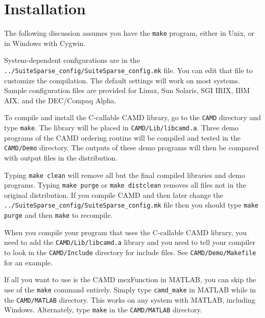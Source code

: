 \documentclass[11pt]{article}
\begin{document}
\section{Installation}
\label{Install}

The following discussion assumes you have the {\tt make} program, either in
Unix, or in Windows with Cygwin.

System-dependent configurations are in the
{\tt ../SuiteSparse\_config/SuiteSparse\_config.mk}
file.  You can edit that file to customize the compilation.  The default
settings will work on most systems.
Sample configuration files are provided
for Linux, Sun Solaris, SGI IRIX, IBM AIX, and the DEC/Compaq Alpha.

To compile and install the C-callable CAMD library,
go to the {\tt CAMD} directory and type {\tt make}.
The library will be placed in {\tt CAMD/Lib/libcamd.a}.
Three demo programs of the CAMD ordering routine will be compiled and tested in
the {\tt CAMD/Demo} directory.
The outputs of these demo programs will then be compared with output
files in the distribution.

Typing {\tt make clean} will remove all but the final compiled libraries
and demo programs.  Typing {\tt make purge} or {\tt make distclean}
removes all files not in the original distribution.
If you compile CAMD and then later change the
{\tt ../SuiteSparse\_config/SuiteSparse\_config.mk} file
then you should type {\tt make purge} and then {\tt make} to recompile.

When you compile your program that uses the C-callable CAMD library,
you need to add the {\tt CAMD/Lib/libcamd.a} library
and you need to tell your compiler to look in the
{\tt CAMD/Include} directory for include
files.
See {\tt CAMD/Demo/Makefile} for an example.

If all you want to use is the CAMD mexFunction in MATLAB, you can skip
the use of the {\tt make} command entirely.  Simply type
{\tt camd\_make} in MATLAB while in the {\tt CAMD/MATLAB} directory.
This works on any system with MATLAB, including Windows.
Alternately, type {\tt make} in the {\tt CAMD/MATLAB} directory.
\end{document}
